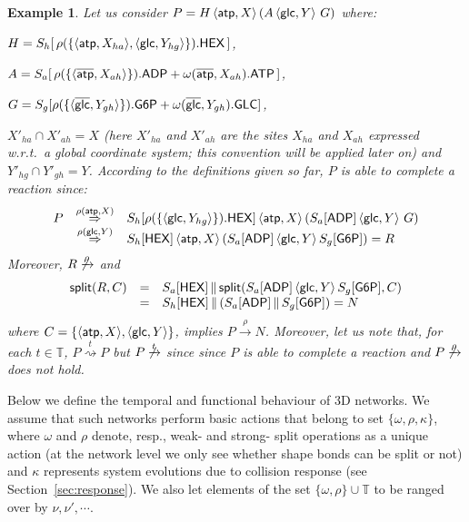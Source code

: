 \documentclass[11pt]{article}
\newtheorem{example}{Example}
\newcommand{\Split}{{\sf split}}
\newcommand{\ch}[2]{\ensuremath{\langle #1, #2 \rangle}}
\newcommand{\unionc}[1]{\,\langle #1 \rangle\,}
\newcommand{\nar}[1]{\xrightarrow{#1}}
\newcommand{\wnar}[1]{\stackrel{#1}{\rightsquigarrow}}
\newcommand{\dnar}[1]{\stackrel{#1}{\Rightarrow}}
\newcommand{\timedomain}{{\mathbb T}}
\begin{document}
\begin{example}
Let us consider $P = H \unionc{{\sf atp}, X} (A  \unionc{{\sf glc}, Y}\,G)$ where:

\begin{description}
\item $H = S_{h}[\,\rho(\{\ch{{\sf atp}}{X_{ha}}, \ch{{\sf glc}}{Y_{hg}}\}). {\sf HEX}\,]$,

\item  $A=S_{a}[\, \rho(\{ \langle \overline{{\sf atp}}, X_{ah} \rangle \}). {\sf ADP}
+ \omega(\overline{{\sf atp}}, X_{ah}). {\sf ATP} \, ]$,

\item $G=S_{g}[\rho(\{ \langle \overline{{\sf glc}}, Y_{gh} \rangle\}). {\sf G6P} +
\omega(\overline{{\sf glc}}, Y_{gh}). {\sf GLC}]$,
\end{description}


\noindent $X'_{ha} \cap X'_{ah} = X$ (here  $X'_{ha}$ and $X'_{ah}$ are the sites $X_{ha}$
and $X_{ah}$ expressed w.r.t.\ a global coordinate system; this convention will be applied later
on)  and $Y'_{hg} \cap Y'_{gh} = Y$. According to the definitions given so far, $P$ is {\em able to complete a reaction} since:
$$\begin{array}{l c l}
P & \dnar{\rho({\sf atp}, X)} &
S_{h}[\rho(\{\langle {\sf glc}, Y_{hg} \rangle\}). {\sf HEX}] \unionc{{\sf atp}, X}
(S_{a}[{\sf ADP}]  \unionc{{\sf glc}, Y} \, G ) \\
& \dnar{\rho({\sf glc}, Y)} &
S_{h}[ {\sf HEX} ] \unionc{{\sf atp}, X} (S_{a}[ {\sf ADP}]  \unionc{{\sf
glc}, Y} S_g [ {\sf G6P} ]) = R
\end{array}$$
\noindent Moreover, $R  \not\nar{\rho}$ and
$$\begin{array}{l c l}
\Split(R, C)  & = &
S_a [{\sf HEX}] \,\|\, \Split(S_{a}[{\sf ADP}] \unionc{{\sf glc}, Y} S_{g}[{\sf G6P}],C) \\ & = &
S_{h}[{\sf HEX}] \,\|\, ( S_{a}[{\sf ADP}] \,\|\, S_{g}[{\sf G6P}] ) = N
\end{array}$$
\noindent  where $C = \{\langle {\sf atp}, X \rangle, \langle {\sf glc}, Y\rangle \} $, implies $P
\nar{\rho} N$. Moreover, let us note that, for each $t \in \timedomain$, $P \wnar{t} P$ but $P
\not\nar{t}$ since since $P$ is able to complete a reaction and $P \not\nar{\rho}$ does not hold.
\end{example}

Below we define the temporal and functional behaviour of 3D networks. We assume that
such networks perform basic actions that belong to set $\{\omega, \rho, \kappa\}$, where $\omega$ and $\rho$ denote, resp., weak- and strong- split operations as a unique action (at the network level we only see whether shape bonds can be split or not) and $\kappa$ represents system evolutions due to collision response (see Section~\ref{sec:response}). We also let elements of the set $\{\omega, \rho\} \cup \timedomain$ to be ranged over by $\nu, \nu', \cdots$.
\end{document}
